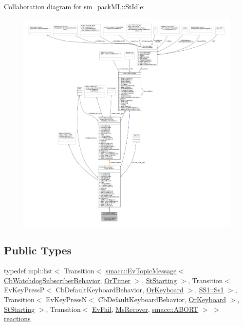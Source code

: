 Collaboration diagram for sm\+\_\+pack\+ML\+:\+:St\+Idle\+:
\nopagebreak
\begin{figure}[H]
\begin{center}
\leavevmode
\includegraphics[width=350pt]{structsm__packML_1_1StIdle__coll__graph}
\end{center}
\end{figure}
\subsection*{Public Types}
\begin{DoxyCompactItemize}
\item 
typedef mpl\+::list$<$ Transition$<$ \hyperlink{structsmacc_1_1default__events_1_1EvTopicMessage}{smacc\+::\+Ev\+Topic\+Message}$<$ \hyperlink{classsm__packML_1_1cl__subscriber_1_1CbWatchdogSubscriberBehavior}{Cb\+Watchdog\+Subscriber\+Behavior}, \hyperlink{classsm__packML_1_1OrTimer}{Or\+Timer} $>$, \hyperlink{structsm__packML_1_1StStarting}{St\+Starting} $>$, Transition$<$ Ev\+Key\+PressP$<$ Cb\+Default\+Keyboard\+Behavior, \hyperlink{classsm__packML_1_1OrKeyboard}{Or\+Keyboard} $>$, \hyperlink{structsm__packML_1_1SS1_1_1Ss1}{S\+S1\+::\+Ss1} $>$, Transition$<$ Ev\+Key\+PressN$<$ Cb\+Default\+Keyboard\+Behavior, \hyperlink{classsm__packML_1_1OrKeyboard}{Or\+Keyboard} $>$, \hyperlink{structsm__packML_1_1StStarting}{St\+Starting} $>$, Transition$<$ \hyperlink{structsm__packML_1_1EvFail}{Ev\+Fail}, \hyperlink{classsm__packML_1_1MsRecover}{Ms\+Recover}, \hyperlink{structsmacc_1_1default__transition__tags_1_1ABORT}{smacc\+::\+A\+B\+O\+RT} $>$ $>$ \hyperlink{structsm__packML_1_1StIdle_a6b6c87d8cf7ac6b95210a8274ca2f4b3}{reactions}
\end{DoxyCompactItemize}
